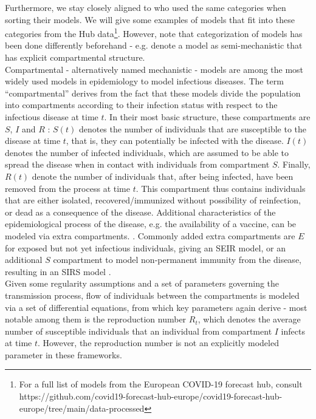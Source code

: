 Furthermore, we stay closely aligned to \cite{bracher_pre-registered_2021} who used the same categories when sorting their models. We will give some examples of models that fit into these categories from the Hub data\footnote{For a full list of models from the European COVID-19 forecast hub, consult https://github.com/covid19-forecast-hub-europe/covid19-forecast-hub-europe/tree/main/data-processed}. However, note that categorization of models has been done differently beforehand - e.g. \cite{funk_assessing_nodate} denote a model as semi-mechanistic that has explicit compartmental structure.\\
Compartmental - alternatively named mechanistic - models are among the most widely used models in epidemiology to model infectious diseases. The term ``compartmental'' derives from the fact that these models divide the population into compartments according to their infection status with respect to the infectious disease at time $t$. In their most basic structure, these compartments are $S$, $I$ and $R$ \citep{brauer_epidemic_2012}: $S(t)$ denotes the number of individuals that are susceptible to the disease at time $t$, that is, they can potentially be infected with the disease. $I(t)$ denotes the number of infected individuals, which are assumed to be able to spread the disease when in contact with individuals from compartment $S$. Finally, $R(t)$ denote the number of individuals that, after being infected, have been removed from the process at time $t$. This compartment thus contains individuals that are either isolated, recovered/immunized without possibility of reinfection, or dead as a consequence of the disease. Additional characteristics of the epidemiological process of the disease, e.g. the availability of a vaccine, can be modeled via extra compartments. . Commonly added extra compartments are $E$ for exposed but not yet infectious individuals, giving an SEIR model, or an additional $S$ compartment to model non-permanent immunity from the disease, resulting in an SIRS model \citep{brauer_epidemic_2012}. \\
Given some regularity assumptions and a set of parameters governing the transmission process, flow of individuals between the compartments is modeled via a set of differential equations, from which key parameters again derive - most notable among them is the reproduction number $R_t$, which denotes the average number of susceptible individuals that an individual from compartment $I$ infects at time $t$. However, the reproduction number is not an explicitly modeled parameter in these frameworks.\\
